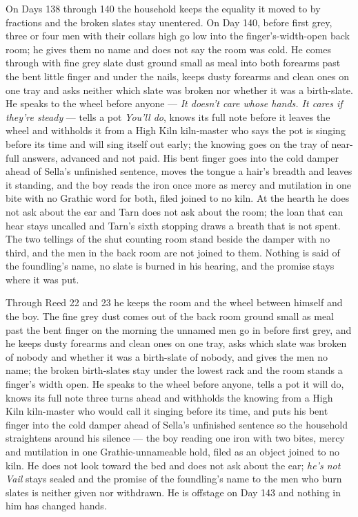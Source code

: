 \documentclass{design/chronicle}
\begin{document}
{On Days 138 through 140 the household keeps the equality it moved to by fractions and the broken slates stay unentered. On Day 140, before first grey, three or four men with their collars high go low into the finger’s-width-open back room; he gives them no name and does not say the room was cold. He comes through with fine grey slate dust ground small as meal into both forearms past the bent little finger and under the nails, keeps dusty forearms and clean ones on one tray and asks neither which slate was broken nor whether it was a birth-slate. He speaks to the wheel before anyone --- \emph{It doesn’t care whose hands. It cares if they’re steady} --- tells a pot \emph{You’ll do}, knows its full note before it leaves the wheel and withholds it from a High Kiln kiln-master who says the pot is singing before its time and will sing itself out early; the knowing goes on the tray of near-full answers, advanced and not paid. His bent finger goes into the cold damper ahead of Sella’s unfinished sentence, moves the tongue a hair’s breadth and leaves it standing, and the boy reads the iron once more as mercy and mutilation in one bite with no Grathic word for both, filed joined to no kiln. At the hearth he does not ask about the ear and Tarn does not ask about the room; the loan that can hear stays uncalled and Tarn’s sixth stopping draws a breath that is not spent. The two tellings of the shut counting room stand beside the damper with no third, and the men in the back room are not joined to them. Nothing is said of the foundling’s name, no slate is burned in his hearing, and the promise stays where it was put.

Through Reed 22 and 23 he keeps the room and the wheel between himself and the boy. The fine grey dust comes out of the back room ground small as meal past the bent finger on the morning the unnamed men go in before first grey, and he keeps dusty forearms and clean ones on one tray, asks which slate was broken of nobody and whether it was a birth-slate of nobody, and gives the men no name; the broken birth-slates stay under the lowest rack and the room stands a finger’s width open. He speaks to the wheel before anyone, tells a pot it will do, knows its full note three turns ahead and withholds the knowing from a High Kiln kiln-master who would call it singing before its time, and puts his bent finger into the cold damper ahead of Sella’s unfinished sentence so the household straightens around his silence — the boy reading one iron with two bites, mercy and mutilation in one Grathic-unnameable hold, filed as an object joined to no kiln. He does not look toward the bed and does not ask about the ear; \emph{he’s not Vail} stays sealed and the promise of the foundling’s name to the men who burn slates is neither given nor withdrawn. He is offstage on Day 143 and nothing in him has changed hands.

}
\end{document}
